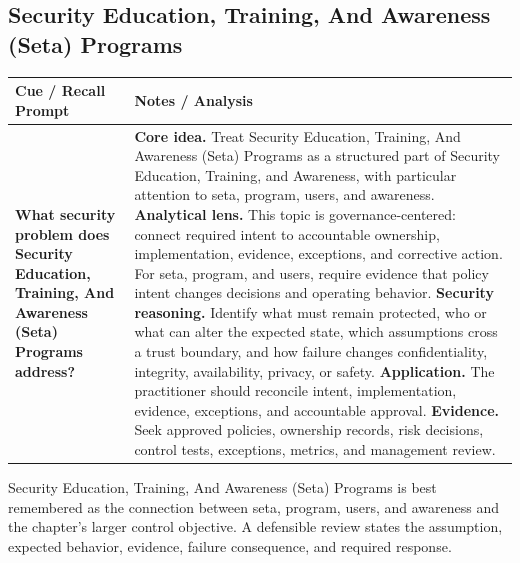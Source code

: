 \documentclass[11pt]{article}
\newcommand{\CornellHeader}{%
\rowcolor{Navy}\color{white}\bfseries Cue / Recall Prompt & \color{white}\bfseries Notes / Analysis\\\hline}
\newcommand{\CornellRow}[2]{%
\cellcolor{CueGray}\RaggedRight\textbf{#1} & \RaggedRight #2\\\hline}
\begin{document}
\subsection*{Security Education, Training, And Awareness (Seta) Programs}
\begin{longtable}{>{\RaggedRight\arraybackslash}p{}|>{\RaggedRight\arraybackslash}p{}}
\CornellHeader
\CornellRow{What security problem does Security Education, Training, And Awareness (Seta) Programs address?}{\textbf{Core idea.} Treat Security Education, Training, And Awareness (Seta) Programs as a structured part of Security Education, Training, and Awareness, with particular attention to seta, program, users, and awareness. \textbf{Analytical lens.} This topic is governance-centered: connect required intent to accountable ownership, implementation, evidence, exceptions, and corrective action. For seta, program, and users, require evidence that policy intent changes decisions and operating behavior. \textbf{Security reasoning.} Identify what must remain protected, who or what can alter the expected state, which assumptions cross a trust boundary, and how failure changes confidentiality, integrity, availability, privacy, or safety. \textbf{Application.} The practitioner should reconcile intent, implementation, evidence, exceptions, and accountable approval. \textbf{Evidence.} Seek approved policies, ownership records, risk decisions, control tests, exceptions, metrics, and management review.}
\end{longtable}
\begin{topicsummary}
Security Education, Training, And Awareness (Seta) Programs is best remembered as the connection between seta, program, users, and awareness and the chapter's larger control objective. A defensible review states the assumption, expected behavior, evidence, failure consequence, and required response.
\end{topicsummary}
\end{document}
